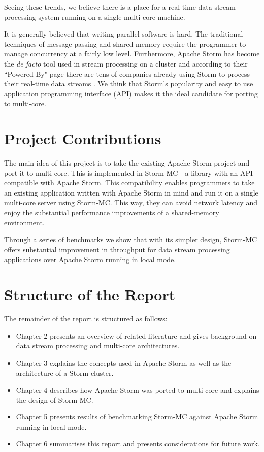 \documentclass[bsc,twoside,singlespacing,normalheadings,parskip]{infthesis}\usepackage[]{graphicx}\usepackage[]{color}
\begin{document}
Seeing these trends, we believe there is a place for a real-time data stream processing system running on a single multi-core machine.

It is generally believed that writing parallel software is hard. The traditional techniques of message passing and shared memory require the programmer to manage concurrency at a fairly low level. Furthermore, Apache Storm has become the \textit{de facto} tool used in stream processing on a cluster and according to their ``Powered By" page there are tens of companies already using Storm to process their real-time data streams \cite{PoweredBy}. We think that Storm's popularity and easy to use application programming interface (API) makes it the ideal candidate for porting to multi-core.

\section{Project Contributions}

The main idea of this project is to take the existing Apache Storm project and port it to multi-core. This is implemented in Storm-MC - a library with an API compatible with Apache Storm. This compatibility enables programmers to take an existing application written with Apache Storm in mind and run it on a single multi-core server using Storm-MC. This way, they can avoid network latency and enjoy the substantial performance improvements of a shared-memory environment.

Through a series of benchmarks we show that with its simpler design, Storm-MC offers substantial improvement in throughput for data stream processing applications over Apache Storm running in local mode.

\section{Structure of the Report}

The remainder of the report is structured as follows:

\begin{itemize}
	\item Chapter 2 presents an overview of related literature and gives background on data stream processing and multi-core architectures.
	\item Chapter 3 explains the concepts used in Apache Storm as well as the architecture of a Storm cluster.
	\item Chapter 4 describes how Apache Storm was ported to multi-core and explains the design of Storm-MC.
	\item Chapter 5 presents results of benchmarking Storm-MC against Apache Storm running in local mode.
	\item Chapter 6 summarises this report and presents considerations for future work.
\end{itemize}
\clearpage{}
\end{document}
